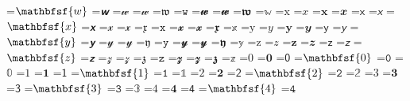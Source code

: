 \documentclass{article}
\begin{document}
=\hbox{$\mathbfsf{w}$}
=\hbox{$\mathbfsfit{w}$}
=\hbox{$\mathcal{w}$}
=\hbox{$\mathscr{w}$}
=\hbox{$\mathfrak{w}$}
=\hbox{$\mathtt{w}$}
=\hbox{$\mathbfcal{w}$}
=\hbox{$\mathbfscr{w}$}
=\hbox{$\mathbffrak{w}$}
=\hbox{$\mathbb{w}$}
=\hbox{$\mathrm{x}$}
=\hbox{$\mathit{x}$}
=\hbox{$\mathbf{x}$}
=\hbox{$\mathbfit{x}$}
=\hbox{$\mathsf{x}$}
=\hbox{$\mathsfit{x}$}
=\hbox{$\mathbfsf{x}$}
=\hbox{$\mathbfsfit{x}$}
=\hbox{$\mathcal{x}$}
=\hbox{$\mathscr{x}$}
=\hbox{$\mathfrak{x}$}
=\hbox{$\mathtt{x}$}
=\hbox{$\mathbfcal{x}$}
=\hbox{$\mathbfscr{x}$}
=\hbox{$\mathbffrak{x}$}
=\hbox{$\mathbb{x}$}
=\hbox{$\mathrm{y}$}
=\hbox{$\mathit{y}$}
=\hbox{$\mathbf{y}$}
=\hbox{$\mathbfit{y}$}
=\hbox{$\mathsf{y}$}
=\hbox{$\mathsfit{y}$}
=\hbox{$\mathbfsf{y}$}
=\hbox{$\mathbfsfit{y}$}
=\hbox{$\mathcal{y}$}
=\hbox{$\mathscr{y}$}
=\hbox{$\mathfrak{y}$}
=\hbox{$\mathtt{y}$}
=\hbox{$\mathbfcal{y}$}
=\hbox{$\mathbfscr{y}$}
=\hbox{$\mathbffrak{y}$}
=\hbox{$\mathbb{y}$}
=\hbox{$\mathrm{z}$}
=\hbox{$\mathit{z}$}
=\hbox{$\mathbf{z}$}
=\hbox{$\mathbfit{z}$}
=\hbox{$\mathsf{z}$}
=\hbox{$\mathsfit{z}$}
=\hbox{$\mathbfsf{z}$}
=\hbox{$\mathbfsfit{z}$}
=\hbox{$\mathcal{z}$}
=\hbox{$\mathscr{z}$}
=\hbox{$\mathfrak{z}$}
=\hbox{$\mathtt{z}$}
=\hbox{$\mathbfcal{z}$}
=\hbox{$\mathbfscr{z}$}
=\hbox{$\mathbffrak{z}$}
=\hbox{$\mathbb{z}$}
=\hbox{$\mathrm{0}$}
=\hbox{$\mathbf{0}$}
=\hbox{$\mathsf{0}$}
=\hbox{$\mathbfsf{0}$}
=\hbox{$\mathtt{0}$}
=\hbox{$\mathbb{0}$}
=\hbox{$\mathrm{1}$}
=\hbox{$\mathbf{1}$}
=\hbox{$\mathsf{1}$}
=\hbox{$\mathbfsf{1}$}
=\hbox{$\mathtt{1}$}
=\hbox{$\mathbb{1}$}
=\hbox{$\mathrm{2}$}
=\hbox{$\mathbf{2}$}
=\hbox{$\mathsf{2}$}
=\hbox{$\mathbfsf{2}$}
=\hbox{$\mathtt{2}$}
=\hbox{$\mathbb{2}$}
=\hbox{$\mathrm{3}$}
=\hbox{$\mathbf{3}$}
=\hbox{$\mathsf{3}$}
=\hbox{$\mathbfsf{3}$}
=\hbox{$\mathtt{3}$}
=\hbox{$\mathbb{3}$}
=\hbox{$\mathrm{4}$}
=\hbox{$\mathbf{4}$}
=\hbox{$\mathsf{4}$}
=\hbox{$\mathbfsf{4}$}
=\hbox{$\mathtt{4}$}
\end{document}
